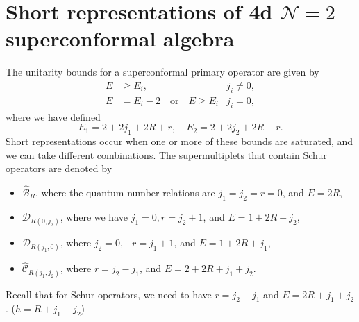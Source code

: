 \documentclass[a4paper,11pt]{article}
\begin{document}
\section{Short representations of 4d $\mathcal{N}=2$ superconformal algebra}
The unitarity bounds for a superconformal primary operator are given by
\begin{equation}
\begin{aligned}
    E &\geq E_i, & j_i \neq  0,\\
    E &= E_i - 2 \quad \mathrm{or} \quad E \geq E_i & j_i = 0,
\end{aligned}
\end{equation}
where we have defined
\begin{equation}
    E_1 = 2 + 2 j_1 + 2R + r, \quad E_2 = 2 + 2 j_2 + 2R -r.
\end{equation}
Short representations occur when one or more of these bounds are saturated, and we can take different combinations. The supermultiplets that contain Schur operators are denoted by
\begin{itemize}
    \item $\hat{\mathcal{B}}_R$, where the quantum number relations are $j_1 = j_2 = r = 0$, and $E = 2R$,
    \item $\mathcal{D}_{R(0, j_2)}$, where we have $j_1 = 0, r = j_2 + 1$, and $E = 1 + 2 R + j_2$,
    \item $\bar{\mathcal{D}}_{R(j_1, 0)}$, where $j_2 = 0, -r = j_1 + 1$, and $E = 1 + 2 R + j_1$,
    \item $\hat{\mathcal{C}}_{R(j_1, j_2)}$, where $r = j_2 - j_1$, and $E = 2 + 2R + j_1 + j_2$.
\end{itemize}

Recall that for Schur operators, we need to have $r = j_2 - j_1$ and $E = 2R + j_1 + j_2$. ($h = R + j_1 + j_2$)
\end{document}
